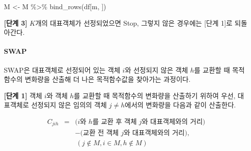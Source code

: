 \documentclass[
]{book}
\newenvironment{Shaded}{\begin{snugshade}}{\end{snugshade}}
\newcommand{\AttributeTok}[1]{\textcolor[rgb]{0.77,0.63,0.00}{#1}}
\newcommand{\CommentTok}[1]{\textcolor[rgb]{0.56,0.35,0.01}{\textit{#1}}}
\newcommand{\DecValTok}[1]{\textcolor[rgb]{0.00,0.00,0.81}{#1}}
\newcommand{\FunctionTok}[1]{\textcolor[rgb]{0.00,0.00,0.00}{#1}}
\newcommand{\NormalTok}[1]{#1}
\newcommand{\OtherTok}[1]{\textcolor[rgb]{0.56,0.35,0.01}{#1}}
\newcommand{\SpecialCharTok}[1]{\textcolor[rgb]{0.00,0.00,0.00}{#1}}
\begin{document}
\begin{Shaded}
\begin{Highlighting}[]
\NormalTok{M }\OtherTok{\textless{}{-}}\NormalTok{ M }\SpecialCharTok{\%\textgreater{}\%}
  \FunctionTok{bind\_rows}\NormalTok{(df[m, ])}
\end{Highlighting}
\end{Shaded}

\textbf{{[}단계 3{]}} \(K\)개의 대표객체가 선정되었으면 Stop, 그렇지 않은 경우에는 {[}단계 1{]}로 되돌아간다.

\hypertarget{pam-swap}{%
\paragraph{SWAP}\label{pam-swap}}

SWAP은 대표객체로 선정되어 있는 객체 \(i\)와 선정되지 않은 객체 \(h\)를 교환할 때 목적함수의 변화량을 산출해 더 나은 목적함수값을 찾아가는 과정이다.

\textbf{{[}단계 1{]}} 객체 \(i\)와 객체 \(h\)를 교환할 때 목적함수의 변화량을 산출하기 위하여 우선, 대표객체로 선정되지 않은 임의의 객체 \(j \neq h\)에서의 변화량을 다음과 같이 산출한다.

\begin{eqnarray*}
C_{jih} &=& \text{($i$와 $h$를 교환 후 객체 $j$와 대표객체와의 거리)}\\
 & & - \text{(교환 전 객체 $j$와 대표객체와의 거리)},\\
 & & \, (j \notin M, i \in M, h \notin M)
\end{eqnarray*}

\begin{Shaded}
\end{Shaded}
\end{document}
